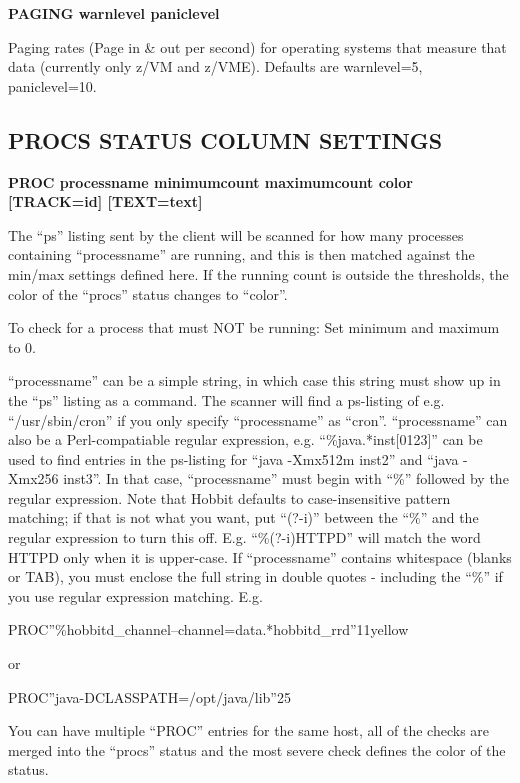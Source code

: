  


 \textbf{PAGING warnlevel paniclevel}



  Paging rates (Page in \& out per second) for operating systems that measure that data (currently only z/VM and z/VME). Defaults are warnlevel=5, paniclevel=10. 


 
\subsection{PROCS STATUS COLUMN SETTINGS}


 \textbf{PROC processname minimumcount maximumcount color [TRACK=id] [TEXT=text]}



  The ``ps'' listing sent by the client will be scanned for how many processes containing ``processname'' are running, and this is then matched against the min/max settings defined here. If the running count is outside the thresholds, the color of the ``procs'' status changes to ``color''. 


  To check for a process that must NOT be running: Set minimum and maximum to 0. 


  ``processname'' can be a simple string, in which case this string must show up in the ``ps'' listing as a command. The scanner will find a ps-listing of e.g. ``/usr/sbin/cron'' if you only specify ``processname'' as ``cron''. ``processname'' can also be a Perl-compatiable regular expression, e.g. ``\%java.*inst[0123]'' can be used to find entries in the ps-listing for ``java -Xmx512m inst2'' and ``java -Xmx256 inst3''. In that case, ``processname'' must begin with ``\%'' followed by the regular expression. Note that Hobbit defaults to case-insensitive pattern matching; if that is not what you want, put ``(?-i)'' between the ``\%'' and the regular expression to turn this off. E.g. ``\%(?-i)HTTPD'' will match the word HTTPD only when it is upper-case.  
 If ``processname'' contains whitespace (blanks or TAB), you must enclose the full string in double quotes - including the ``\%'' if you use regular expression matching. E.g. 


  
PROC''\%hobbitd\_channel--channel=data.*hobbitd\_rrd''11yellow 


  or 


  
PROC''java-DCLASSPATH=/opt/java/lib''25 


  You can have multiple ``PROC'' entries for the same host, all of the checks are merged into the ``procs'' status and the most severe check defines the color of the status. 


